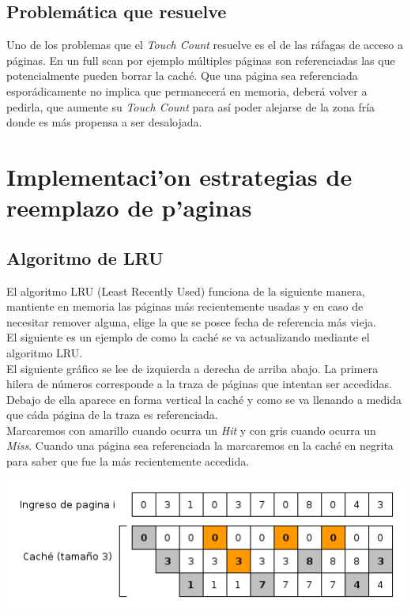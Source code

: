 \documentclass[11pt, a4paper, spanish]{article}
\begin{document}
\subsection{Problem\'atica que resuelve}

Uno de los problemas que el \textit{Touch Count} resuelve es el de las r\'afagas de acceso a p\'aginas. En un full scan por ejemplo m\'ultiples p\'aginas
son referenciadas las que potencialmente pueden borrar la cach\'e. Que una p\'agina sea referenciada espor\'adicamente no implica que permanecer\'a en memoria, deber\'a volver a pedirla, que aumente su \textit{Touch Count} para as\'i poder alejarse de la zona fr\'ia donde es m\'as propensa a ser desalojada.

\newpage 
\section{Implementaci'on estrategias de reemplazo de p'aginas}

\subsection{Algoritmo de LRU}

El algoritmo LRU (Least Recently Used) funciona de la siguiente manera, mantiente en memoria las p\'aginas m\'as recientemente usadas
y en caso de necesitar remover alguna, elige la que se posee fecha de referencia m\'as vieja.\\

El siguiente es un ejemplo de como la cach\'e se va actualizando mediante el algoritmo LRU.\\

El siguiente gr\'afico se lee de izquierda a derecha de arriba abajo. La primera hilera de n\'umeros corresponde a la traza de p\'aginas que intentan ser 
accedidas. Debajo de ella aparece en forma vertical la cach\'e y como se va llenando a medida que c\'ada p\'agina de la traza es referenciada.\\ 

Marcaremos con amarillo cuando ocurra un \textit{Hit} y con gris cuando ocurra un \textit{Miss}.
Cuando una p\'agina sea referenciada la marcaremos en la cach\'e en negrita para saber que fue la m\'as recientemente accedida.\\

\begin{center}
		\includegraphics[scale=0.65]{diagramas/LRUAlgorithm.png}\\
\end{center}
\end{document}
